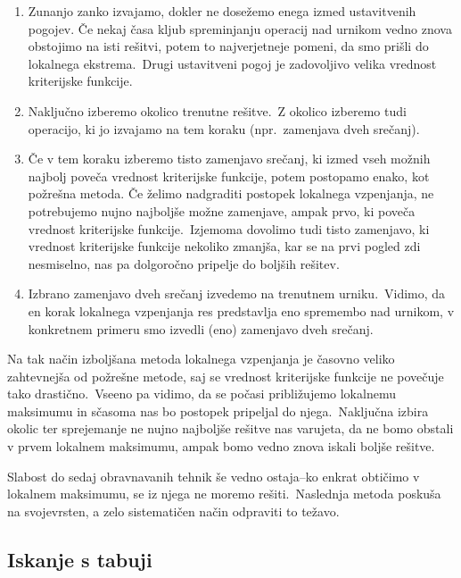 \documentclass[a4paper,10pt]{article}
\begin{document}
\begin{enumerate}
   \item Zunanjo zanko izvajamo, dokler ne dosežemo enega izmed ustavitvenih pogojev.
   Če nekaj časa kljub spreminjanju operacij nad urnikom vedno znova obstojimo na isti
   rešitvi, potem to najverjetneje pomeni, da smo prišli do lokalnega ekstrema.\ Drugi
   ustavitveni pogoj je zadovoljivo velika vrednost kriterijske funkcije.

   \item Naključno izberemo okolico trenutne rešitve.\ Z okolico izberemo tudi operacijo,
   ki jo izvajamo na tem koraku (npr.\ zamenjava dveh srečanj).

   \item Če v tem koraku izberemo tisto zamenjavo srečanj, ki izmed vseh možnih najbolj
   poveča vrednost kriterijske funkcije, potem postopamo enako, kot požrešna metoda. Če
   želimo nadgraditi postopek lokalnega vzpenjanja, ne potrebujemo nujno najboljše možne
   zamenjave, ampak prvo, ki poveča vrednost kriterijske funkcije.\ Izjemoma dovolimo tudi
   tisto zamenjavo, ki vrednost kriterijske funkcije nekoliko zmanjša, kar se na prvi
   pogled zdi nesmiselno, nas pa dolgoročno pripelje do boljših rešitev.

   \item Izbrano zamenjavo dveh srečanj izvedemo na trenutnem urniku.\ Vidimo, da en korak
   lokalnega vzpenjanja res predstavlja eno spremembo nad urnikom, v konkretnem primeru
   smo izvedli (eno) zamenjavo dveh srečanj.
\end{enumerate}

\noindent Na tak način izboljšana metoda lokalnega vzpenjanja je časovno veliko zahtevnejša od
požrešne metode, saj se vrednost kriterijske funkcije ne povečuje tako drastično.\ Vseeno
pa vidimo, da se počasi približujemo lokalnemu maksimumu in sčasoma nas bo postopek
pripeljal do njega.\ Naključna izbira okolic ter sprejemanje ne nujno najboljše rešitve
nas varujeta, da ne bomo obstali v prvem lokalnem maksimumu, ampak bomo vedno znova
iskali boljše rešitve.

Slabost do sedaj obravnavanih tehnik še vedno ostaja--ko enkrat obtičimo v lokalnem
maksimumu, se iz njega ne moremo rešiti.\ Naslednja metoda poskuša na svojevrsten, a zelo
sistematičen način odpraviti to težavo.

\subsection{Iskanje s tabuji}
\end{document}
